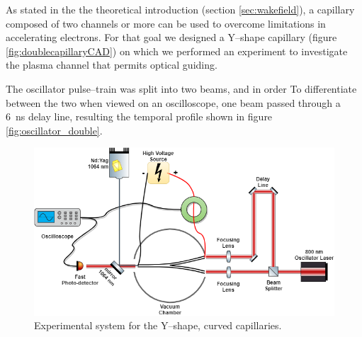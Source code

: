\documentclass[../main.tex]{subfiles}
\begin{document}
As stated in the the theoretical introduction (section \ref{sec:wakefield}), a capillary composed of two channels or more can be used to overcome limitations in accelerating electrons. For that goal we designed a Y--shape capillary (figure \ref{fig:doublecapillaryCAD}) on which we performed an experiment to investigate the plasma channel that permits optical guiding.

The oscillator pulse--train was split into two beams, and in order To differentiate between the two when viewed on an oscilloscope, one beam passed through a \SI{6}{\ns} delay line, resulting the temporal profile shown in figure \ref{fig:oscillator_double}.

\begin{figure}
    \centering
    \includegraphics[width=\textwidth]{Curved capillaries/figures-double capillary.png}
    \caption{Experimental system for the Y--shape, curved capillaries.}
    \label{fig:twostage_system}
\end{figure}
\end{document}
